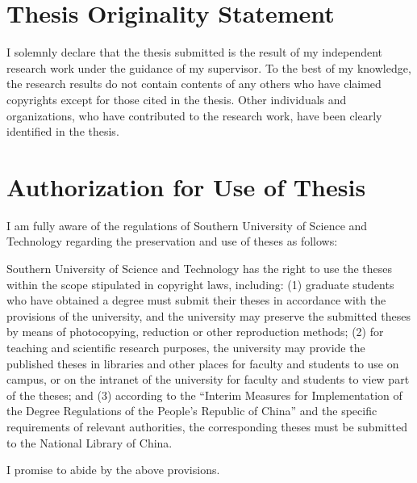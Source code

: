 \begin{statementcopyright}
  \section*{Thesis Originality Statement}
  \vspace{1em}

    I solemnly declare that the thesis submitted is the result of my independent research work under the guidance of my supervisor. To the best of my knowledge, the research results do not contain contents of any others who have claimed copyrights except for those cited in the thesis. Other individuals and organizations, who have contributed to the research work, have been clearly identified in the thesis.

  \authorsign

  \section*{Authorization for Use of Thesis}

  \vspace{1em}

    I am fully aware of the regulations of Southern University of Science and Technology regarding the preservation and use of theses as follows:

    Southern University of Science and Technology has the right to use the theses within the scope stipulated in copyright laws, including: (1) graduate students who have obtained a degree must submit their theses in accordance with the provisions of the university, and the university may preserve the submitted theses by means of photocopying, reduction or other reproduction methods; (2) for teaching and scientific research purposes, the university may provide the published theses in libraries and other places for faculty and students to use on campus, or on the intranet of the university for faculty and students to view part of the theses; and (3) according to the “Interim Measures for Implementation of the Degree Regulations of the People’s Republic of China” and the specific requirements of relevant authorities, the corresponding theses must be submitted to the National Library of China.

    I promise to abide by the above provisions.
    

  \authorsupervisorsign

\end{statementcopyright}